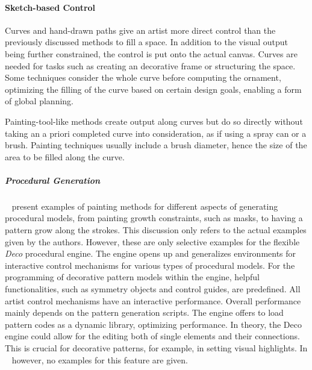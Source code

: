 \paragraph{Sketch-based Control}
\label{para:analysis_rulebased_sketchbased}


Curves and hand-drawn paths give an artist more direct control than the previously discussed methods to fill a space. In addition to the visual output being further constrained, the control is put onto the actual canvas. Curves are needed for tasks such as creating an decorative frame or structuring the space. Some techniques consider the whole curve before computing the ornament, optimizing the filling of the curve based on certain design goals, enabling a form of global planning.

Painting-tool-like methods create output along curves but do so directly without taking an a priori completed curve into consideration, as if using a spray can or a brush. Painting techniques usually include a brush diameter, hence the size of the area to be filled along the curve.



\subparagraph{Procedural Generation}
\label{subpara:analysis_rulebased_sketchbased_procedural}

\citeauthor*{mech_2012_tdf}~\cite{mech_2012_tdf} present examples of painting methods for different aspects of generating procedural models, from painting growth constraints, such as masks, to having a pattern grow along the strokes. This discussion only refers to the actual examples given by the authors. However, these are only selective examples for the flexible \textit{Deco} procedural engine. The engine opens up and generalizes environments for interactive control mechanisms for various types of procedural models. For the programming of decorative pattern models within the engine, helpful functionalities, such as symmetry objects and control guides, are predefined. All artist control mechanisms have an interactive performance. Overall performance mainly depends on the pattern generation scripts. The engine offers to load pattern codes as a dynamic library, optimizing performance. In theory, the Deco engine could allow for the editing both of single elements and their connections. This is crucial for decorative patterns, for example, in setting visual highlights. In \citeauthor*{mech_2012_tdf}~\cite{mech_2012_tdf} however, no examples for this feature are given. 

